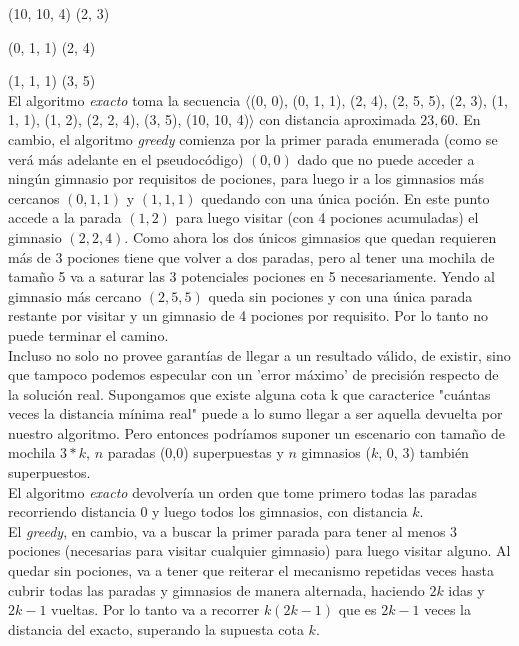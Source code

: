     (10, 10, 4)    \quad   (2, 3)

    (0, 1, 1)    \quad  \quad  (2, 4)

    (1, 1, 1)    \quad  \quad  (3, 5)
    \\

    El algoritmo \emph{exacto} toma la secuencia $\langle$(0, 0), (0, 1, 1), (2, 4), (2, 5, 5), (2, 3), (1, 1, 1), (1, 2), (2, 2, 4), (3, 5), (10, 10, 4)$\rangle$ con distancia aproximada $23,60$. En cambio, el algoritmo \emph{greedy} comienza por la primer parada enumerada (como se verá más adelante en el pseudocódigo) $(0, 0)$ dado que no puede acceder a ningún gimnasio por requisitos de pociones, para luego ir a los gimnasios más cercanos $(0, 1, 1)$ y $(1, 1, 1)$ quedando con una única poción. En este punto accede a la parada $(1, 2)$ para luego visitar (con 4 pociones acumuladas) el gimnasio $(2, 2, 4)$. Como ahora los dos únicos gimnasios que quedan requieren más de 3 pociones tiene que volver a dos paradas, pero al tener una mochila de tamaño 5 va a saturar las 3 potenciales pociones en 5 necesariamente. Yendo al gimnasio más cercano $(2,5,5)$ queda sin pociones y con una única parada restante por visitar y un gimnasio de 4 pociones por requisito. Por lo tanto no puede terminar el camino.
    \\

    Incluso no solo no provee garantías de llegar a un resultado válido, de existir, sino que tampoco podemos especular con un 'error máximo' de precisión respecto de la solución real. Supongamos que existe alguna cota k que caracterice "cuántas veces la distancia mínima real" puede a lo sumo llegar a ser aquella devuelta por nuestro algoritmo. Pero entonces podríamos suponer un escenario con tamaño de mochila $3*k$, $n$ paradas (0,0) superpuestas y $n$ gimnasios ($k$, 0, 3) también superpuestos.
    \\

    El algoritmo \emph{exacto} devolvería un orden que tome primero todas las paradas recorriendo distancia 0 y luego todos los gimnasios, con distancia $k$.
    \\

    El \emph{greedy}, en cambio, va a buscar la primer parada para tener al menos 3 pociones (necesarias para visitar cualquier gimnasio) para luego visitar alguno. Al quedar sin pociones, va a tener que reiterar el mecanismo repetidas veces hasta cubrir todas las paradas y gimnasios de manera alternada, haciendo $2k$ idas y $2k-1$ vueltas. Por lo tanto va a recorrer $k(2k-1)$ que es $2k-1$ veces la distancia del exacto, superando la supuesta cota $k$.

